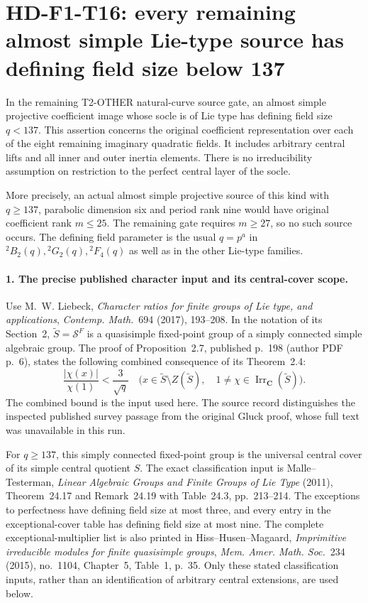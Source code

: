 \section[HD-F1-T16: Lie-type defining fields below 137]{HD-F1-T16: every remaining almost simple Lie-type source has defining field size below 137}
\label{sec:f1-large-field-lie-source-exclusion}

In the remaining T2-OTHER natural-curve source gate, an almost
simple projective coefficient image whose socle is of Lie type
has defining field size \(q<137\). This assertion concerns the
original coefficient representation over each of the eight
remaining imaginary quadratic fields. It includes arbitrary
central lifts and all inner and outer inertia elements. There
is no irreducibility assumption on restriction to the perfect
central layer of the socle.

More precisely, an actual almost simple projective source of
this kind with \(q\ge137\), parabolic dimension six and period
rank nine would have original coefficient rank \(m\le25\).
The remaining gate requires \(m\ge27\), so no such source
occurs. The defining field parameter is the usual \(q=p^a\)
in \({}^2B_2(q),{}^2G_2(q),{}^2F_4(q)\) as well as in
the other Lie-type families.

\paragraph{1. The precise published character input and its central-cover scope.}
Use M.~W. Liebeck, \emph{Character ratios for finite groups
of Lie type, and applications}, \emph{Contemp. Math.}~694
(2017), 193--208. In the notation of its Section~2,
\(\widetilde S=\mathcal S^F\) is a quasisimple fixed-point
group of a simply connected simple algebraic group. The
proof of Proposition~2.7, published p.~198 (author PDF p.~6),
states the following combined consequence of its Theorem~2.4:
\[
 \frac{|\chi(x)|}{\chi(1)}<\frac3{\sqrt q}
 \quad
 \bigl(x\in\widetilde S\setminus Z(\widetilde S),\quad
       1\ne\chi\in\operatorname{Irr}_{\mathbf C}(\widetilde S)\bigr).
 \tag{F1T16.1}
\]
The combined bound is the input used here. The source record
distinguishes the inspected published survey passage from
the original Gluck proof, whose full text was unavailable
in this run.

For \(q\ge137\), this simply connected fixed-point group
is the universal central cover of its simple central
quotient \(S\). The exact classification input is
Malle--Testerman, \emph{Linear Algebraic Groups and Finite
Groups of Lie Type} (2011), Theorem~24.17 and
Remark~24.19 with Table~24.3, pp.~213--214.
The exceptions to perfectness have defining field size
at most three, and every entry in the exceptional-cover
table has defining field size at most nine. The complete
exceptional-multiplier list is also printed in
Hiss--Husen--Magaard, \emph{Imprimitive irreducible modules
for finite quasisimple groups}, \emph{Mem. Amer. Math.
Soc.}~234 (2015), no.~1104, Chapter~5, Table~1, p.~35.
Only these stated classification inputs, rather than an
identification of arbitrary central extensions, are used
below.

